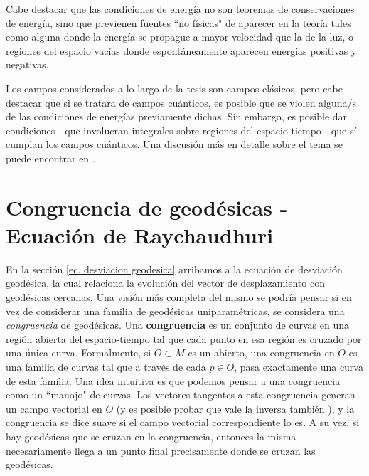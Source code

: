 Cabe destacar que las condiciones de energía no son teoremas de conservaciones de energía, sino que previenen fuentes ``no físicas" de aparecer en la teoría tales como alguna donde la energía se propague a mayor velocidad que la de la luz, o regiones del espacio vacías donde espontáneamente aparecen energías positivas y negativas. 

Los campos considerados a lo largo de la tesis son campos clásicos, pero cabe destacar que si se tratara de campos cuánticos, es posible que se violen alguna/s de las condiciones de energías previamente dichas. Sin embargo, es posible dar condiciones - que involucran integrales sobre regiones del espacio-tiempo - que sí cumplan los campos cuánticos. Una discusión más en detalle sobre el tema se puede encontrar en \citep{2011CQGra..28l5009F}.







    
\section{Congruencia de geodésicas - Ecuación de Raychaudhuri}\label{seccion eq Raychaudhuri}



En la sección \ref{ec. desviacion geodesica} arribamos a la ecuación de desviación geodésica, la cual relaciona la evolución del vector de desplazamiento con geodésicas cercanas. Una visión más completa del mismo se podría pensar si en vez de considerar una familia de geodésicas uniparamétricas, se considera una \textit{congruencia} de geodésicas. Una \textbf{congruencia} es un conjunto de curvas en una región abierta del espacio-tiempo tal que cada punto en esa región es cruzado por una única curva. Formalmente, si $O\subset M$ es un abierto, una congruencia en $O$ es una familia de curvas tal que a través de cada $p\in O$, pasa exactamente una curva de esta familia. Una idea intuitiva es que podemos pensar a una congruencia como un ``manojo" de curvas. Los vectores tangentes a esta congruencia generan un campo vectorial en $O$ (y es posible probar que vale la inversa también \citep{1984ucp..book.....W}), y la congruencia se dice suave si el campo vectorial correspondiente lo es. A su vez, si hay geodésicas que se cruzan en la congruencia, entonces la misma necesariamente llega a un punto final precisamente donde se cruzan las geodésicas.

